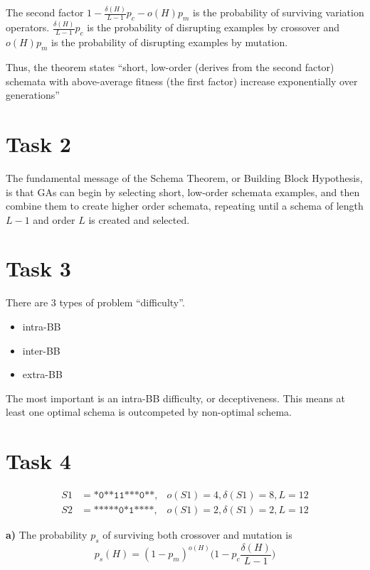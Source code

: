 \documentclass[12pt, a4paper]{article}
\begin{document}
        The second factor $1 - \frac{\delta(H)}{L - 1} p_c - o(H) p_m$ is the
        probability of surviving variation operators. $\frac{\delta(H)}{L - 1} p_c$
        is the probability of disrupting examples by crossover and $o(H) p_m$ is the
        probability of disrupting examples by mutation.

        Thus, the theorem states ``short, low-order (derives from the second factor)
        schemata with above-average fitness (the first factor) increase exponentially
        over generations''

    \section{Task 2}
        The fundamental message of the Schema Theorem, or Building Block Hypothesis,
        is that GAs can begin by selecting short, low-order schemata examples, and
        then combine them to create higher order schemata, repeating until a schema
        of length $L-1$ and order $L$ is created and selected.

    \section{Task 3}
        There are 3 types of problem ``difficulty''.
        \begin{itemize}
            \item intra-BB
            \item inter-BB
            \item extra-BB
        \end{itemize}
        The most important is an intra-BB difficulty, or deceptiveness. This means
        at least one optimal schema is outcompeted by non-optimal schema.

    \section{Task 4}
        \begin{align*}
            S1 &= \texttt{*0**11***0**}, & o(S1) = 4, \delta(S1) = 8, L = 12\\
            S2 &= \texttt{*****0*1****}, & o(S1) = 2, \delta(S1) = 2, L = 12
        \end{align*}

        {\bf a)} The probability $p_s$ of surviving both crossover and mutation is
        $$p_s(H) = (1 - p_m)^{o(H)}\Big(1 - p_c \frac{\delta(H)}{L - 1}\Big)$$
\end{document}
